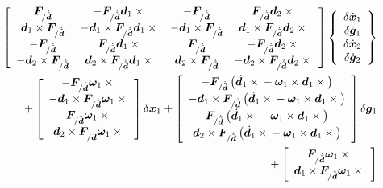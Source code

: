 \documentclass[10pt,fleqn,subeqn]{report}
\newcommand{\T}[1]{\bm{#1}}
\begin{document}
\begin{align}
	\sqbr{\matr{cccc}{
		\T{F}_{/\dot{\tilde{\T{d}}}} & -\T{F}_{/\dot{\tilde{\T{d}}}} \T{d}_1\times{} &
			- \T{F}_{/\dot{\tilde{\T{d}}}} & \T{F}_{/\dot{\tilde{\T{d}}}} \T{d}_2\times{} \\
		\T{d}_1 \times \T{F}_{/\dot{\tilde{\T{d}}}} &
			- \T{d}_1 \times \T{F}_{/\dot{\tilde{\T{d}}}} \T{d}_1\times{} &
			- \T{d}_1 \times \T{F}_{/\dot{\tilde{\T{d}}}} &
			\T{d}_1 \times \T{F}_{/\dot{\tilde{\T{d}}}} \T{d}_2\times{} \\
		- \T{F}_{/\dot{\tilde{\T{d}}}} & \T{F}_{/\dot{\tilde{\T{d}}}} \T{d}_1\times{} &
			\T{F}_{/\dot{\tilde{\T{d}}}} & - \T{F}_{/\dot{\tilde{\T{d}}}} \T{d}_2\times{} \\
		- \T{d}_2 \times \T{F}_{/\dot{\tilde{\T{d}}}} &
			\T{d}_2 \times \T{F}_{/\dot{\tilde{\T{d}}}} \T{d}_1\times{} &
			\T{d}_2 \times \T{F}_{/\dot{\tilde{\T{d}}}} &
			- \T{d}_2 \times \T{F}_{/\dot{\tilde{\T{d}}}} \T{d}_2\times{}
	}} \cubr{\cvvect{
		\delta\dot{\T{x}}_1 \\
		\delta\dot{\T{g}}_1 \\
		\delta\dot{\T{x}}_2 \\
		\delta\dot{\T{g}}_2
	}}
	& \nonumber \\
%
%
%
	\mbox{}
	+ \sqbr{\cvvect{
		- \T{F}_{/\dot{\tilde{\T{d}}}} \T{\omega}_1 \times{} \\
		- \T{d}_1 \times \T{F}_{/\dot{\tilde{\T{d}}}} \T{\omega}_1 \times{} \\
		\T{F}_{/\dot{\tilde{\T{d}}}} \T{\omega}_1 \times{} \\
		\T{d}_2 \times \T{F}_{/\dot{\tilde{\T{d}}}} \T{\omega}_1 \times{}
	}} \delta\T{x}_1 
%
	+ \sqbr{\cvvect{
		- \T{F}_{/\dot{\tilde{\T{d}}}} \plbr{
			\dot{\T{d}}_1 \times{} - \T{\omega}_1 \times \T{d}_1\times{}
		} \\
		- \T{d}_1 \times \T{F}_{/\dot{\tilde{\T{d}}}} \plbr{
			\dot{\T{d}}_1 \times{} - \T{\omega}_1 \times \T{d}_1\times{}
		} \\
		\T{F}_{/\dot{\tilde{\T{d}}}} \plbr{
			\dot{\T{d}}_1 \times{} - \T{\omega}_1 \times \T{d}_1\times{}
		} \\
		\T{d}_2 \times \T{F}_{/\dot{\tilde{\T{d}}}} \plbr{
			\dot{\T{d}}_1 \times{} - \T{\omega}_1 \times \T{d}_1\times{}
		}
	}} \delta\T{g}_1
	& \nonumber \\
%
	\mbox{}
	+ \sqbr{\cvvect{
		\T{F}_{/\dot{\tilde{\T{d}}}} \T{\omega}_1 \times{} \\
		\T{d}_1 \times \T{F}_{/\dot{\tilde{\T{d}}}} \T{\omega}_1 \times{} \\
}}
\end{align}
\end{document}
